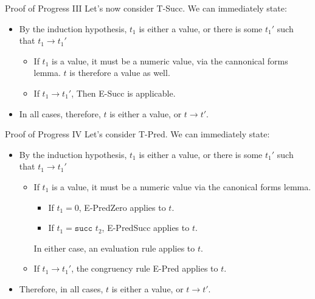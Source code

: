 \documentclass[11pt]{beamer}
\begin{document}
\begin{frame}[fragile=singleslide]{Proof of Progress III}
Let's now consider T-Succ.  We can immediately state:
\begin{itemize}
\item By the induction hypothesis, $t_1$ is either a value, or there is some $t_1'$ such that $t_1 \rightarrow t_1'$
\begin{itemize}
\item If $t_1$ is a value, it must be a numeric value, via the cannonical forms lemma.  $t$ is therefore a value as well.
\item If $t_1 \rightarrow t_1'$, Then E-Succ is applicable. 
\end{itemize}
\item In all cases, therefore, $t$ is either a value, or $t \rightarrow t'$.
\end{itemize}
\end{frame}

\begin{frame}[fragile=singleslide]{Proof of Progress IV}
Let's consider T-Pred.  We can immediately state:
\begin{itemize}
\item By the induction hypothesis, $t_1$ is either a value, or there is some $t_1'$ such that $t_1 \rightarrow t_1'$
\begin{itemize}
\item If $t_1$ is a value, it must be a numeric value via the canonical forms lemma.  
\begin{itemize}
\item If $t_1 = 0$, E-PredZero applies to $t$.
\item If $t_1 = \texttt{succ } t_2$, E-PredSucc applies to $t$.
\end{itemize}
In either case, an evaluation rule applies to $t$.
\item If $t_1 \rightarrow t_1'$, the congruency rule E-Pred applies to $t$.
\end{itemize}
\item Therefore, in all cases, $t$ is either a value, or $t \rightarrow t'$.
\end{itemize}
\end{frame}
\end{document}
